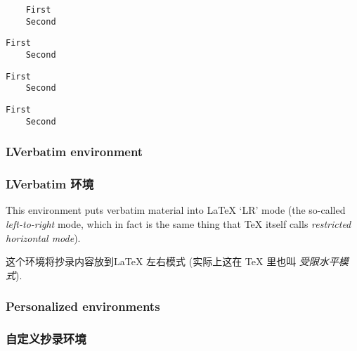 \documentclass[twoside]{article}
\newcommand\verbatimTxt{抄录}
\begin{document}
\begin{SideBySideExample}
  \begin{BVerbatim}
    First
    Second
  \end{BVerbatim}
  \begin{BVerbatim}[baseline=c]
    First
    Second
  \end{BVerbatim}
\end{SideBySideExample}

\begin{SideBySideExample}
  \begin{BVerbatim}[boxwidth=2cm]
    First
    Second
  \end{BVerbatim}
  \begin{BVerbatim}[boxwidth=2cm,
                    baseline=t]
    First
    Second
  \end{BVerbatim}
\end{SideBySideExample}

\subsubsection{LVerbatim environment}
\subsubsection{LVerbatim 环境}

This environment puts verbatim material into \LaTeX{} `LR' mode (the
so-called \emph{left-to-right} mode, which in fact is the same thing that
\TeX{} itself calls \emph{restricted horizontal mode}).

  这个环境将抄录内容放到\LaTeX{} 左右模式 (实际上这在
\TeX{} 里也叫 \emph{受限水平模式}).


\subsubsection{Personalized environments}
\subsubsection{自定义{\verbatimTxt}环境}
\end{document}
